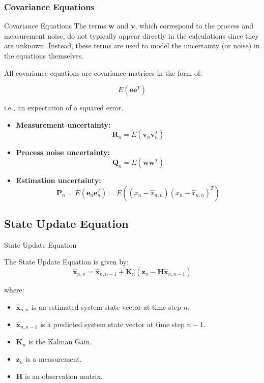 \subsubsection{Covariance Equations}
\begin{frame}{Covariance Equations}
    The terms $\mathbf{w}$ and $\mathbf{v}$, which correspond to the process and measurement noise, do not typically appear directly in the calculations since they are unknown. Instead, these terms are used to model the uncertainty (or noise) in the equations themselves.

    \vspace{5pt}
    All covariance equations are covariance matrices in the form of:

    $$E(\mathbf{e}\mathbf{e}^T)$$

    i.e., an expectation of a squared error.
\begin{itemize}
    \item \textbf{Measurement uncertainty:} $$\mathbf{R}_n = E(\mathbf{v}_n\mathbf{v}_n^T)$$

    \item \textbf{Process noise uncertainty:} $$\mathbf{Q}_n = E(\mathbf{w}\mathbf{w}^T)$$

    \item \textbf{Estimation uncertainty:} $$\mathbf{P}_n = E(\mathbf{e}_n\mathbf{e}_n^T) = E \left((x_n - \hat{x}_{n,n})(x_n - \hat{x}_{n,n})^T\right)$$
\end{itemize}
    
\end{frame}


\subsection{State Update Equation}
\begin{frame}{State Update Equation}
\begin{minipage}{1\linewidth} 
\begin{exampleblock}{}{
The State Update Equation is given by:
\begin{equation*}
\hat{\mathbf{x}}_{n,n} = \hat{\mathbf{x}}_{n,n-1} + \mathbf{K}_n(\mathbf{z}_n - \mathbf{H}\hat{\mathbf{x}}_{n,n-1}) \tag{3}
\end{equation*}

where:
\begin{itemize}
    \item $\hat{\mathbf{x}}_{n,n}$ is an estimated system state vector at time step \(n\).
    \item $\hat{\mathbf{x}}_{n,n-1}$ is a predicted system state vector at time step \(n - 1\).
    \item $\mathbf{K}_n$ is the Kalman Gain.
    \item $\mathbf{z}_n$ is a measurement.
    \item $\mathbf{H}$ is an observation matrix.
\end{itemize}}
\end{exampleblock}
\end{minipage}

\end{frame}


